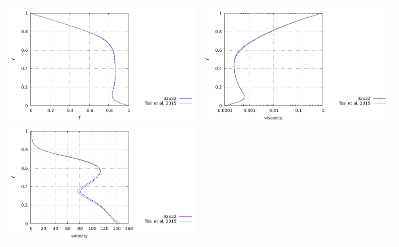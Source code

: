 \begin{center}
\includegraphics[width=5cm]{python_codes/fieldstone_28/results_case3/T_profile.pdf}
\includegraphics[width=5cm]{python_codes/fieldstone_28/results_case3/eta_profile.pdf}
\includegraphics[width=5cm]{python_codes/fieldstone_28/results_case3/V_profile.pdf}
\end{center}


